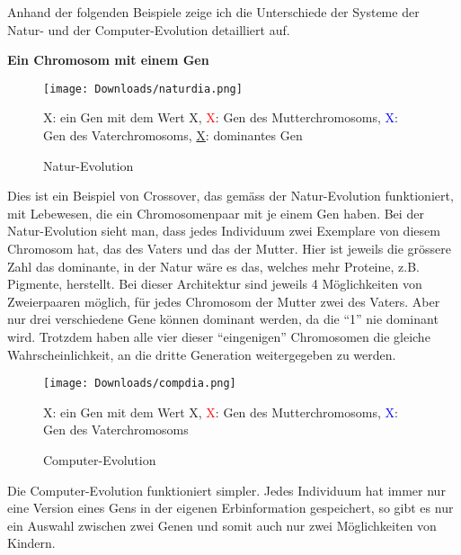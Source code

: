 \documentclass[10pt,a4paper,ngerman,english]{article}
\begin{document}
Anhand der folgenden Beispiele zeige ich die Unterschiede der Systeme der Natur- und der Computer-Evolution detailliert auf.

\textbf{Ein Chromosom mit einem Gen}

\bigskip

\begin{figure}[h]
    \centering
    \texttt{[image: Downloads/naturdia.png]}
    \caption{Natur-Evolution}
    \medskip
    \scriptsize
    X: ein Gen mit dem Wert X, \textcolor{red}{X}: Gen des Mutterchromosoms, \textcolor{blue}{X}: Gen des Vaterchromosoms, \underline{X}: dominantes Gen
\end{figure}

Dies ist ein Beispiel von Crossover, das gemäss der Natur-Evolution funktioniert, mit Lebewesen, die ein Chromosomenpaar mit je einem Gen haben. Bei der Natur-Evolution sieht man, dass jedes Individuum zwei Exemplare von diesem Chromosom hat, das des Vaters und das der Mutter. Hier ist jeweils die grössere Zahl das dominante, in der Natur wäre es das, welches mehr Proteine, z.B. Pigmente, herstellt. Bei dieser Architektur sind jeweils 4 Möglichkeiten von Zweierpaaren möglich, für jedes Chromosom der Mutter zwei des Vaters. Aber nur drei verschiedene Gene können dominant werden, da die \enquote{1} nie dominant wird. Trotzdem haben alle vier dieser \enquote{eingenigen} Chromosomen die gleiche Wahrscheinlichkeit, an die dritte Generation weitergegeben zu werden.

\begin{wrapfigure}[6]{r}{0.5\textwidth} 
    \vspace{-20pt}
        \begin{center}
            \texttt{[image: Downloads/compdia.png]}
            \vspace{-20pt}
            \caption{Computer-Evolution}
            \medskip
            \scriptsize
            X: ein Gen mit dem Wert X, \textcolor{red}{X}: Gen des Mutterchromosoms, \textcolor{blue}{X}: Gen des Vaterchromosoms
        \end{center}
    \vspace{-30pt}
\end{wrapfigure}

\bigskip
Die Computer-Evolution funktioniert simpler. Jedes Individuum hat immer nur eine Version eines Gens in der eigenen Erbinformation gespeichert, so gibt es nur ein Auswahl zwischen zwei Genen und somit auch nur zwei Möglichkeiten von Kindern.
\end{document}
